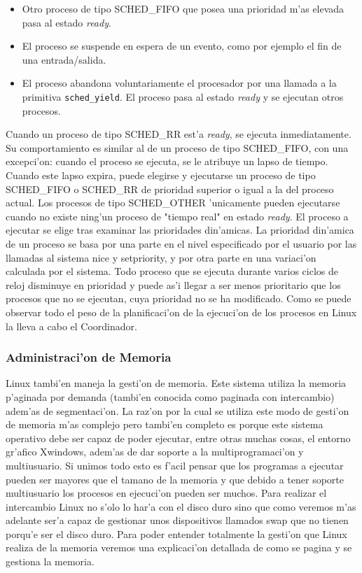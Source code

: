 \begin{itemize}
	\item Otro proceso de tipo SCHED\_FIFO que posea una prioridad m'as elevada pasa al estado \textit{ready}.
	\item El proceso se suspende en espera de un evento, como por ejemplo el fin de una entrada/salida.
	\item El proceso abandona voluntariamente el procesador por una llamada a la primitiva \texttt{sched\_yield}. El proceso pasa al estado \textit{ready} y se ejecutan otros procesos.
\end{itemize}

Cuando un proceso de tipo SCHED\_RR est'a \textit{ready}, se ejecuta inmediatamente. Su comportamiento es similar al de un proceso de tipo SCHED\_FIFO, con una excepci'on: cuando el proceso se ejecuta, se le atribuye un lapso de tiempo. Cuando este lapso expira, puede elegirse y ejecutarse un proceso de tipo SCHED\_FIFO o SCHED\_RR de prioridad superior o igual a la del proceso actual.
Los procesos de tipo SCHED\_OTHER 'unicamente pueden ejecutarse cuando no existe ning'un proceso de "tiempo real" en estado \textit{ready}. El proceso a ejecutar se elige tras examinar las prioridades din'amicas. La prioridad din'amica de un proceso se basa por una parte en el nivel especificado por el usuario por las llamadas al sistema nice y setpriority, y por otra parte en una variaci'on calculada por el sistema. Todo proceso que se ejecuta durante varios ciclos de reloj disminuye en prioridad y puede as'i llegar a ser menos prioritario que los procesos que no se ejecutan, cuya prioridad no se ha modificado.
Como se puede observar todo el peso de la planificaci'on de la ejecuci'on de los procesos en Linux la lleva a cabo el Coordinador.

\subsubsection{Administraci'on de Memoria}
Linux tambi'en maneja la gesti'on de memoria. Este sistema utiliza la memoria p'aginada por demanda (tambi'en conocida como paginada con intercambio) adem'as de segmentaci'on. La raz'on por la cual se utiliza este modo de gesti'on de memoria m'as complejo pero tambi'en completo es porque este sistema operativo debe ser capaz de poder ejecutar, entre otras muchas cosas, el entorno gr'afico Xwindows, adem'as de dar soporte a la multiprogramaci'on y multiusuario. Si unimos todo esto es f'acil pensar que los programas a ejecutar pueden ser mayores que el tamano de la memoria y que debido a tener soporte multiusuario los procesos en ejecuci'on pueden ser muchos. Para realizar el intercambio Linux no s'olo lo har'a con el disco duro sino que como veremos m'as adelante ser'a capaz de gestionar unos dispositivos llamados swap que no tienen porqu'e ser el disco duro.
Para poder entender totalmente la gesti'on que Linux realiza de la memoria veremos una explicaci'on detallada de como se pagina y se gestiona la memoria.
